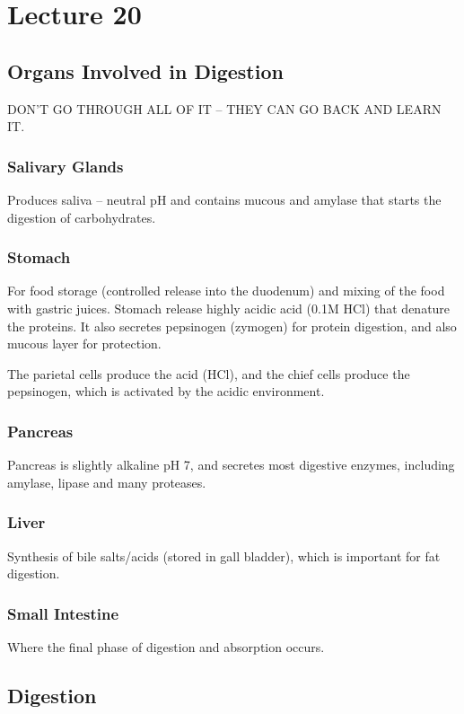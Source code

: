 \documentclass[a4paper, 12pt]{report}
\newcommand{\mychapter}[2]{
    \setcounter{chapter}{#1}
    \setcounter{section}{0}
    \chapter*{#2}
    \addcontentsline{toc}{chapter}{#2}
}
\begin{document}
\mychapter{20}{Lecture 20}

\section{Organs Involved in Digestion}

DON'T GO THROUGH ALL OF IT -- THEY CAN GO BACK AND LEARN IT.

\subsection{Salivary Glands}

Produces saliva -- neutral pH and contains mucous and amylase that starts the digestion of carbohydrates.

\subsection{Stomach}

For food storage (controlled release into the duodenum) and mixing of the food with gastric juices.
Stomach release highly acidic acid (0.1M HCl) that denature the proteins.
It also secretes pepsinogen (zymogen) for protein digestion, and also mucous layer for protection.

The parietal cells produce the acid (HCl), and the chief cells produce the pepsinogen, which is activated by the acidic environment.

\subsection{Pancreas}

Pancreas is slightly alkaline pH 7, and secretes most digestive enzymes, including amylase, lipase and many proteases.

\subsection{Liver}

Synthesis of bile salts/acids (stored in gall bladder), which is important for fat digestion.

\subsection{Small Intestine}

Where the final phase of digestion and absorption occurs.

\section{Digestion}
\end{document}
